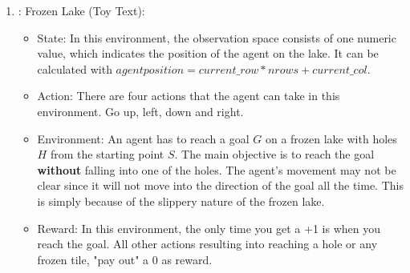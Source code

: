 \documentclass{article}
\numberwithin{equation}{section}
\numberwithin{equation}{section}
\begin{document}
\begin{enumerate}
\item : Frozen Lake (Toy Text):
\begin{itemize}
\item State: In this environment, the observation space consists of one numeric value, which indicates the position of the agent on the lake. It can be calculated with $agent{position} = current\_row * nrows + current\_col$.
\item Action: There are four actions that the agent can take in this environment. Go up, left, down and right.
\item Environment: An agent has to reach a goal $G$ on a frozen lake with holes $H$ from the starting point $S$. The main objective is to reach the goal \textbf{without} falling into one of the holes. The agent's movement may not be clear since it will not move into the direction of the goal all the time. This is simply because of the slippery nature of the frozen lake.
\item Reward: In this environment, the only time you get a +1 is when you reach the goal. All other actions resulting into reaching a hole or any frozen tile, "pay out" a 0 as reward.
\end{itemize}


\end{enumerate}





\begin{comment}

\begin{figure}[H]
	\centering
	
	\texttt{[image: agent600.png]}
	\\	
	\vspace{0.1in}
	\textbf{Fig.3:} A trained agent with num\_episodes = 600
	\\
	\label{fig:Fig.3}
\end{figure}
\end{comment}
\end{document}
